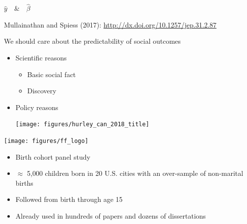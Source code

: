 \documentclass[aspectratio=169]{beamer}
\newcommand\bblue[1]{{\color{blue}\textbf{#1}}}
\begin{document}
\begin{frame}
\end{frame}
\begin{frame}

\begin{center}
\LARGE{
$ \hat{y} \quad \& \quad \hat{\beta}$
}
\end{center}

\vfill
\small{Mullainathan and Spiess (2017): \url{http://dx.doi.org/10.1257/jep.31.2.87}}
\end{frame}
\begin{frame}

We should care about the predictability of social outcomes\pause
\begin{itemize}
\item Scientific reasons \pause
\begin{itemize}
\item Basic social fact
\item Discovery \pause
\end{itemize}
\item Policy reasons
\begin{center}
\texttt{[image: figures/hurley\_can\_2018\_title]} 
\end{center}
\end{itemize}

\end{frame}
\begin{frame}

\begin{center}
\texttt{[image: figures/ff\_logo]}
\end{center}

\begin{itemize}
\item Birth cohort panel study
\item $\approx$ 5,000 children born in 20 U.S. cities with an over-sample of non-marital births
\item Followed from birth through age 15
\item Already used in hundreds of papers and dozens of dissertations
\end{itemize}

\end{frame}
\end{document}

